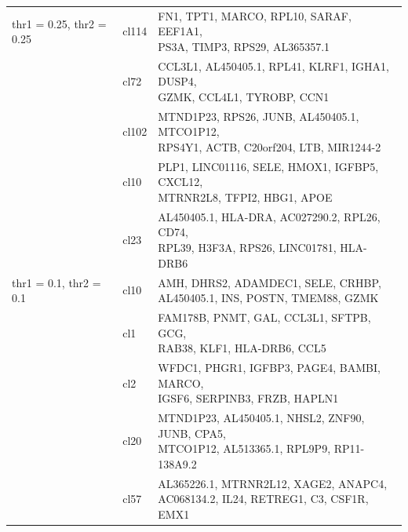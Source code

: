 \begin{table}[ht!]
\begin{tabular}{l|l|l}
\midrule
thr1 = 0.25, thr2 = 0.25 & cl114 & \specialcell[t]{FN1, TPT1, MARCO, RPL10, SARAF, EEF1A1,\\PS3A, TIMP3, RPS29, AL365357.1}  \\
 & cl72 & \specialcell[t]{CCL3L1, AL450405.1, RPL41, KLRF1, IGHA1, DUSP4,\\GZMK, CCL4L1, TYROBP, CCN1}  \\
 & cl102 & \specialcell[t]{MTND1P23, RPS26, JUNB, AL450405.1, MTCO1P12,\\RPS4Y1, ACTB, C20orf204, LTB, MIR1244-2}  \\
 & cl10 & \specialcell[t]{PLP1, LINC01116, SELE, HMOX1, IGFBP5, CXCL12,\\MTRNR2L8, TFPI2, HBG1, APOE}  \\
 & cl23 & \specialcell[t]{ AL450405.1, HLA-DRA, AC027290.2, RPL26, CD74,\\RPL39, H3F3A, RPS26, LINC01781, HLA-DRB6}  \\

\midrule
thr1 = 0.1, thr2 = 0.1 & cl10 & \specialcell[t]{AMH, DHRS2, ADAMDEC1, SELE, CRHBP,\\AL450405.1, INS, POSTN, TMEM88, GZMK}  \\
 & cl1 & \specialcell[t]{FAM178B, PNMT, GAL, CCL3L1, SFTPB, GCG,\\RAB38, KLF1, HLA-DRB6, CCL5}  \\
 & cl2 & \specialcell[t]{WFDC1, PHGR1, IGFBP3, PAGE4, BAMBI, MARCO,\\IGSF6, SERPINB3, FRZB, HAPLN1}  \\
 & cl20 & \specialcell[t]{MTND1P23, AL450405.1, NHSL2, ZNF90, JUNB, CPA5,\\MTCO1P12, AL513365.1, RPL9P9, RP11-138A9.2}  \\
 & cl57 & \specialcell[t]{AL365226.1, MTRNR2L12, XAGE2, ANAPC4,\\AC068134.2, IL24, RETREG1, C3, CSF1R, EMX1}  \\

\bottomrule
\end{tabular}
\end{table}